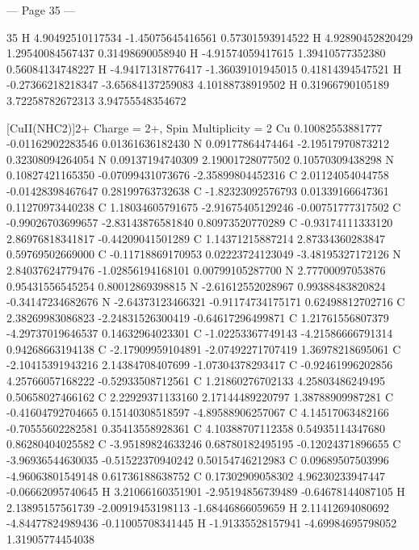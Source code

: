 --- Page 35 ---
 
35 
  H   4.90492510117534     -1.45075645416561      0.57301593914522 
  H   4.92890452820429      1.29540084567437      0.31498690058940 
  H   -4.91574059417615      1.39410577352380      0.56084134748227 
  H   -4.94171318776417     -1.36039101945015      0.41814394547521 
  H   -0.27366218218347     -3.65684137259083      4.10188738919502 
  H   0.31966790105189      3.72258782672313      3.94755548354672 
 
[CuII(NHC2)]2+ 
Charge = 2+, Spin Multiplicity = 2 
  Cu  0.10082553881777     -0.01162902283546      0.01361636182430 
  N   0.09177864474464     -2.19517970873212      0.32308094264054 
  N   0.09137194740309      2.19001728077502      0.10570309438298 
  N   0.10827421165350     -0.07099431073676     -2.35899804452316 
  C   2.01124054044758     -0.01428398467647      0.28199763732638 
  C   -1.82323092576793      0.01339166647361      0.11270973440238 
  C   1.18034605791675     -2.91675405129246     -0.00751777317502 
  C   -0.99026703699657     -2.83143876581840      0.80973520770289 
  C   -0.93174111333120      2.86976818341817     -0.44209041501289 
  C   1.14371215887214      2.87334360283847      0.59769502669000 
  C   -0.11718869170953      0.02223724123049     -3.48195327172126 
  N   2.84037624779476     -1.02856194168101      0.00799105287700 
  N   2.77700097053876      0.95431556545254      0.80012869398815 
  N   -2.61612552028967      0.99388483820824     -0.34147234682676 
  N   -2.64373123466321     -0.91174734175171      0.62498812702716 
  C   2.38269983086823     -2.24831526300419     -0.64617296499871 
  C   1.21761556807379     -4.29737019646537      0.14632964023301 
  C   -1.02253367749143     -4.21586666791314      0.94268663194138 
  C   -2.17909959104891     -2.07492271707419      1.36978218695061 
  C   -2.10415391943216      2.14384708407699     -1.07304378293417 
  C   -0.92461996202856      4.25766057168222     -0.52933508712561 
  C   1.21860276702133      4.25803486249495      0.50658027466162 
  C   2.22929371133160      2.17144489220797      1.38788909987281 
  C   -0.41604792704665      0.15140308518597     -4.89588906257067 
  C   4.14517063482166     -0.70555602282581      0.35413558928361 
  C   4.10388707112358      0.54935114347680      0.86280404025582 
  C   -3.95189824633246      0.68780182495195     -0.12024371896655 
  C   -3.96936544630035     -0.51522370940242      0.50154746212983 
  C   0.09689507503996     -4.96063801549148      0.61736188638752 
  C   0.17302909058302      4.96230233947447     -0.06662095740645 
  H   3.21066160351901     -2.95194856739489     -0.64678144087105 
  H   2.13895157561739     -2.00919453198113     -1.68446866059659 
  H   2.11412694080692     -4.84477824989436     -0.11005708341445 
  H   -1.91335528157941     -4.69984695798052      1.31905774454038 


